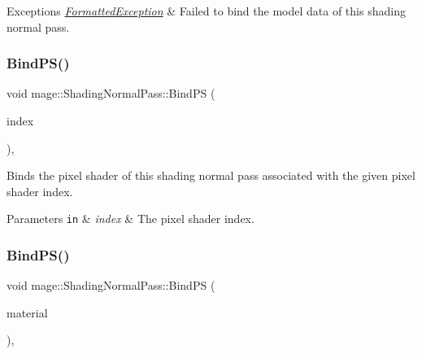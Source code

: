 \begin{DoxyExceptions}{Exceptions}
{\em \hyperlink{classmage_1_1_formatted_exception}{Formatted\+Exception}} & Failed to bind the model data of this shading normal pass. \\
\hline
\end{DoxyExceptions}
\hypertarget{classmage_1_1_shading_normal_pass_ab691c2125f9e21c7e70f2737037504bc}{}\label{classmage_1_1_shading_normal_pass_ab691c2125f9e21c7e70f2737037504bc} 
\subsubsection{\texorpdfstring{Bind\+P\+S()}{BindPS()}\hspace{0.1cm}{\footnotesize\ttfamily [1/2]}}
{\footnotesize\ttfamily void mage\+::\+Shading\+Normal\+Pass\+::\+Bind\+PS (\begin{DoxyParamCaption}\item[{\hyperlink{classmage_1_1_shading_normal_pass_a6d277753d26a7854c448b3e0d9275b19}{P\+S\+Index}}]{index }\end{DoxyParamCaption})\hspace{0.3cm}{\ttfamily [private]}, {\ttfamily [noexcept]}}

Binds the pixel shader of this shading normal pass associated with the given pixel shader index.


\begin{DoxyParams}[1]{Parameters}
\mbox{\tt in}  & {\em index} & The pixel shader index. \\
\hline
\end{DoxyParams}
\hypertarget{classmage_1_1_shading_normal_pass_af8ef8987bda86646712780b5cfad0b72}{}\label{classmage_1_1_shading_normal_pass_af8ef8987bda86646712780b5cfad0b72} 
\subsubsection{\texorpdfstring{Bind\+P\+S()}{BindPS()}\hspace{0.1cm}{\footnotesize\ttfamily [2/2]}}
{\footnotesize\ttfamily void mage\+::\+Shading\+Normal\+Pass\+::\+Bind\+PS (\begin{DoxyParamCaption}\item[{const \hyperlink{classmage_1_1_material}{Material} $\ast$}]{material }\end{DoxyParamCaption})\hspace{0.3cm}{\ttfamily [private]}, {\ttfamily [noexcept]}}

